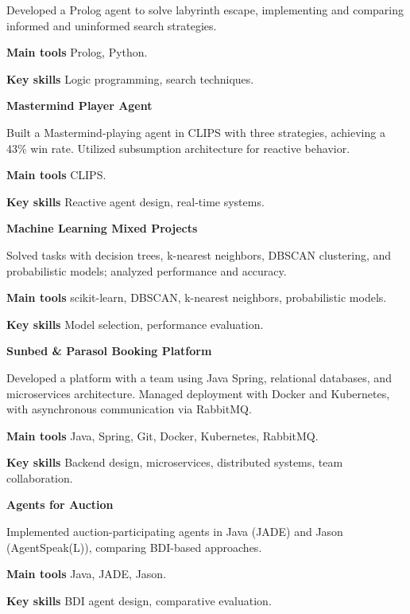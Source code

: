 \documentclass[11pt]{article}
\begin{document}
Developed a Prolog agent to solve labyrinth escape, implementing and comparing informed and uninformed search strategies.

\textbf{Main tools}
Prolog, Python.

\textbf{Key skills}
 Logic programming, search techniques.
\vspace{12pt}

\textbf{Mastermind Player Agent}

Built a Mastermind-playing agent in CLIPS with three strategies, achieving a 43\% win rate. Utilized subsumption architecture for reactive behavior.

\textbf{Main tools}
CLIPS.

\textbf{Key skills}
Reactive agent design, real-time systems.
\vspace{12pt}

\textbf{Machine Learning Mixed Projects}

Solved tasks with decision trees, k-nearest neighbors, DBSCAN clustering, and probabilistic models; analyzed performance and accuracy.

\textbf{Main tools}
scikit-learn, DBSCAN, k-nearest neighbors, probabilistic models.

\textbf{Key skills}
Model selection, performance evaluation.
\vspace{12pt}

\textbf{Sunbed \& Parasol Booking Platform}

Developed a platform with a team using Java Spring, relational databases, and microservices architecture. Managed deployment with Docker and Kubernetes, with asynchronous communication via RabbitMQ.

\textbf{Main tools}
Java, Spring, Git, Docker, Kubernetes, RabbitMQ.

\textbf{Key skills}
Backend design, microservices, distributed systems, team collaboration.
\vspace{12pt}

\textbf{Agents for Auction}

Implemented auction-participating agents in Java (JADE) and Jason (AgentSpeak(L)), comparing BDI-based approaches.

\textbf{Main tools}
Java, JADE, Jason.

\textbf{Key skills}
BDI agent design, comparative evaluation.
\vspace{12pt}
\end{document}
